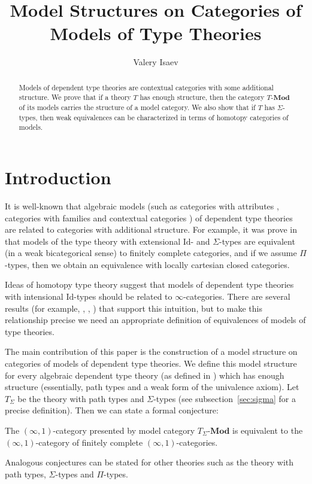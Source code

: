 \documentclass[reqno]{amsart}
\theoremstyle{definition}
\theoremstyle{remark}
\newcommand{\Id}{\mathrm{Id}}
\newcommand{\cat}[1]{\mathbf{#1}}
\newcommand{\Mod}[1]{#1\text{-}\cat{Mod}}
\numberwithin{figure}{section}
\begin{document}
\title{Model Structures on Categories of Models of Type Theories}

\author{Valery Isaev}

\begin{abstract}
Models of dependent type theories are contextual categories with some additional structure.
We prove that if a theory $T$ has enough structure, then the category $\Mod{T}$ of its models carries the structure of a model category.
We also show that if $T$ has $\Sigma$-types, then weak equivalences can be characterized in terms of homotopy categories of models.
\end{abstract}

\maketitle

\section{Introduction}

It is well-known that algebraic models (such as categories with attributes \cite{pitts}, categories with families \cite{cwf} and contextual categories \cite{GAT})
of dependent type theories are related to categories with additional structure.
For example, it was prove in \cite{ext-eq} that models of the type theory with extensional $\Id$- and $\Sigma$-types are equivalent (in a weak bicategorical sense)
to finitely complete categories, and if we assume $\Pi$-types, then we obtain an equivalence with locally cartesian closed categories.

Ideas of homotopy type theory suggest that models of dependent type theories with intensional $\Id$-types should be related to $\infty$-categories.
There are several results (for example, \cite{shul-inv}, \cite{local-universes}, \cite{kapulkin}) that support this intuition,
but to make this relationship precise we need an appropriate definition of equivalences of models of type theories.

The main contribution of this paper is the construction of a model structure on categories of models of dependent type theories.
We define this model structure for every algebraic dependent type theory (as defined in \cite{alg-tt}) which has enough structure
(essentially, path types and a weak form of the univalence axiom).
Let $T_\Sigma$ be the theory with path types and $\Sigma$-types (see subsection~\ref{sec:sigma} for a precise definition).
Then we can state a formal conjecture:
\begin{conj}
The $(\infty,1)$-category presented by model category $\Mod{T_\Sigma}$ is equivalent to the $(\infty,1)$-category of finitely complete $(\infty,1)$-categories.
\end{conj}
Analogous conjectures can be stated for other theories such as the theory with path types, $\Sigma$-types and $\Pi$-types.
\end{document}

